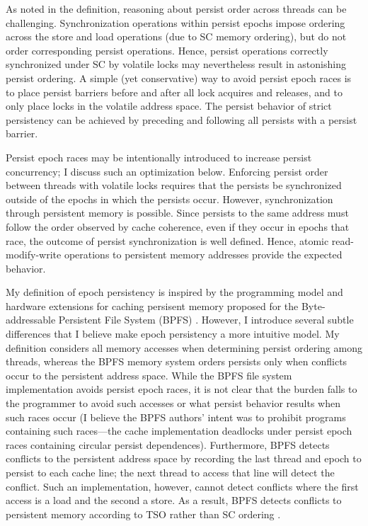 As noted in the definition, reasoning about persist order across threads can be challenging.
Synchronization operations within persist epochs impose ordering across the store and load operations (due to SC memory ordering), but do not order corresponding persist operations.
Hence, persist operations correctly synchronized under SC by volatile locks may nevertheless result in astonishing persist ordering.
A simple (yet conservative) way to avoid persist epoch races is to place persist barriers before and after all lock acquires and releases, and to only place locks in the volatile address space.
The persist behavior of strict persistency can be achieved by preceding and following all persists with a persist barrier.

Persist epoch races may be intentionally introduced to increase persist concurrency; I discuss such an optimization below.
Enforcing persist order between threads with volatile locks requires that the persists be synchronized outside of the epochs in which the persists occur.
However, synchronization through persistent memory is possible.
Since persists to the same address must follow the order observed by cache coherence, even if they occur in epochs that race, the outcome of persist synchronization is well defined.
Hence, atomic read-modify-write operations to persistent memory addresses provide the expected behavior.

My definition of epoch persistency is inspired by the programming model and hardware extensions for caching persisent memory proposed for the Byte-addressable Persistent File System (BPFS) \cite{ConditNightingale09}.
However, I introduce several subtle differences that I believe make epoch persistency a more intuitive model.
My definition considers all memory accesses when determining persist ordering among threads, whereas the BPFS memory system orders persists only when conflicts occur to the persistent address space.
While the BPFS file system implementation avoids persist epoch races, it is not clear that the burden falls to the programmer to avoid such accesses or what persist behavior results when such races occur (I believe the BPFS authors' intent was to prohibit programs containing such races---the cache implementation deadlocks under persist epoch races containing circular persist dependences).  
Furthermore, BPFS detects conflicts to the persistent address space by recording the last thread and epoch to persist to each cache line; the next thread to access that line will detect the conflict.
Such an implementation, however, cannot detect conflicts where the first access is a load and the second a store.
As a result, BPFS detects conflicts to persistent memory according to TSO rather than SC ordering \cite{SPARCv9}.

